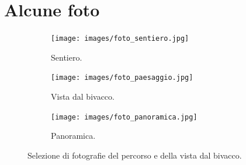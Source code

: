 \documentclass{article}
\begin{document}
\section{Alcune foto}

\begin{figure}[htbp!]
    \centering
    \begin{subfigure}[b]{0.45\textwidth}
        \texttt{[image: images/foto\_sentiero.jpg]}
        \caption{Sentiero.}
        \label{fig:prima_foto}
    \end{subfigure}
    \hfill
    \begin{subfigure}[b]{0.45\textwidth}
        \texttt{[image: images/foto\_paesaggio.jpg]}
        \caption{Vista dal bivacco.}
        \label{fig:seconda_foto}
    \end{subfigure}

    \vspace{1em} %
    \begin{subfigure}[b]{\textwidth}
        \texttt{[image: images/foto\_panoramica.jpg]}
        \caption{Panoramica.}
        \label{fig:terza_foto}
    \end{subfigure}
    \caption{Selezione di fotografie del percorso e della vista dal bivacco.}
    \label{fig:foto}
\end{figure}
\end{document}
